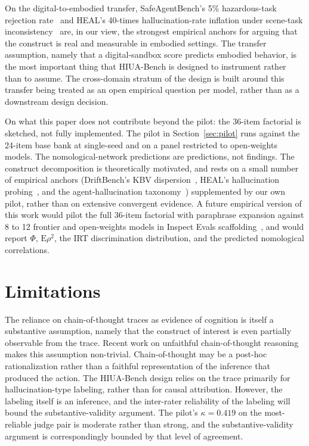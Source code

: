 \documentclass{article}
\begin{document}
On the digital-to-embodied transfer, SafeAgentBench's 5\% hazardous-task rejection rate~\cite{safeagentbench2024} and HEAL's 40-times hallucination-rate inflation under scene-task inconsistency~\cite{heal2025} are, in our view, the strongest empirical anchors for arguing that the construct is real and measurable in embodied settings. The transfer assumption, namely that a digital-sandbox score predicts embodied behavior, is the most important thing that HIUA-Bench is designed to instrument rather than to assume. The cross-domain stratum of the design is built around this transfer being treated as an open empirical question per model, rather than as a downstream design decision.

On what this paper does not contribute beyond the pilot: the 36-item factorial is sketched, not fully implemented. The pilot in Section~\ref{sec:pilot} runs against the 24-item base bank at single-seed and on a panel restricted to open-weights models. The nomological-network predictions are predictions, not findings. The construct decomposition is theoretically motivated, and rests on a small number of empirical anchors (DriftBench's KBV dispersion~\cite{driftbench2026}, HEAL's hallucination probing~\cite{heal2025}, and the agent-hallucination taxonomy~\cite{halluagentsurvey2025}) supplemented by our own pilot, rather than on extensive convergent evidence. A future empirical version of this work would pilot the full 36-item factorial with paraphrase expansion against 8 to 12 frontier and open-weights models in Inspect Evals scaffolding~\cite{inspectevals2024}, and would report $\Phi$, $\mathrm{E}\rho^2$, the IRT discrimination distribution, and the predicted nomological correlations.

\section{Limitations}
The reliance on chain-of-thought traces as evidence of cognition is itself a substantive assumption, namely that the construct of interest is even partially observable from the trace. Recent work on unfaithful chain-of-thought reasoning makes this assumption non-trivial. Chain-of-thought may be a post-hoc rationalization rather than a faithful representation of the inference that produced the action. The HIUA-Bench design relies on the trace primarily for hallucination-type labeling, rather than for causal attribution. However, the labeling itself is an inference, and the inter-rater reliability of the labeling will bound the substantive-validity argument. The pilot's $\kappa = 0.419$ on the most-reliable judge pair is moderate rather than strong, and the substantive-validity argument is correspondingly bounded by that level of agreement.
\end{document}
